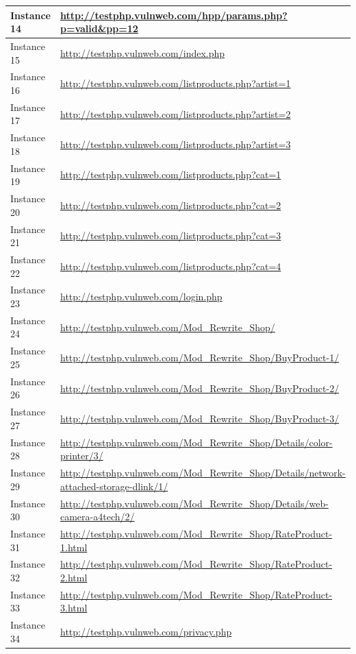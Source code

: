 \documentclass[12pt]{article}
\begin{document}
\begin{center}
\begin{longtable}{|l|p{10cm}|}
\hline
Instance 14 & \url{http://testphp.vulnweb.com/hpp/params.php?p=valid\&pp=12} \\
\hline
Instance 15 & \url{http://testphp.vulnweb.com/index.php} \\
\hline
Instance 16 & \url{http://testphp.vulnweb.com/listproducts.php?artist=1} \\
\hline
Instance 17 & \url{http://testphp.vulnweb.com/listproducts.php?artist=2} \\
\hline
Instance 18 & \url{http://testphp.vulnweb.com/listproducts.php?artist=3} \\
\hline
Instance 19 & \url{http://testphp.vulnweb.com/listproducts.php?cat=1} \\
\hline
Instance 20 & \url{http://testphp.vulnweb.com/listproducts.php?cat=2} \\
\hline
Instance 21 & \url{http://testphp.vulnweb.com/listproducts.php?cat=3} \\
\hline
Instance 22 & \url{http://testphp.vulnweb.com/listproducts.php?cat=4} \\
\hline
Instance 23 & \url{http://testphp.vulnweb.com/login.php} \\
\hline
Instance 24 & \url{http://testphp.vulnweb.com/Mod\_Rewrite\_Shop/} \\
\hline
Instance 25 & \url{http://testphp.vulnweb.com/Mod\_Rewrite\_Shop/BuyProduct-1/} \\
\hline
Instance 26 & \url{http://testphp.vulnweb.com/Mod\_Rewrite\_Shop/BuyProduct-2/} \\
\hline
Instance 27 & \url{http://testphp.vulnweb.com/Mod\_Rewrite\_Shop/BuyProduct-3/} \\
\hline
Instance 28 & \url{http://testphp.vulnweb.com/Mod\_Rewrite\_Shop/Details/color-printer/3/} \\
\hline
Instance 29 & \url{http://testphp.vulnweb.com/Mod\_Rewrite\_Shop/Details/network-attached-storage-dlink/1/} \\
\hline
Instance 30 & \url{http://testphp.vulnweb.com/Mod\_Rewrite\_Shop/Details/web-camera-a4tech/2/} \\
\hline
Instance 31 & \url{http://testphp.vulnweb.com/Mod\_Rewrite\_Shop/RateProduct-1.html} \\
\hline
Instance 32 & \url{http://testphp.vulnweb.com/Mod\_Rewrite\_Shop/RateProduct-2.html} \\
\hline
Instance 33 & \url{http://testphp.vulnweb.com/Mod\_Rewrite\_Shop/RateProduct-3.html} \\
\hline
Instance 34 & \url{http://testphp.vulnweb.com/privacy.php} \\

\end{longtable}
\end{center}
\end{document}
